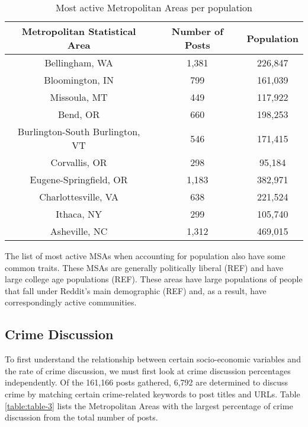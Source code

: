 \documentclass[12pt,oneside, letterpaper]{book}
\begin{document}
\begin{table}[h!]
    \centering
    \small
    \caption{Most active Metropolitan Areas per population}
    \begin{tabular}{| c | c | c |}
    \hline
    Metropolitan Statistical Area & Number of Posts & Population\\ \hline
    Bellingham, WA & 1,381 & 226,847 \\ \hline
    Bloomington, IN & 799 & 161,039 \\ \hline
    Missoula, MT & 449 & 117,922 \\ \hline
    Bend, OR & 660 & 198,253 \\ \hline
    Burlington-South Burlington, VT & 546 & 171,415 \\ \hline
    Corvallis, OR & 298 & 95,184 \\ \hline
    Eugene-Springfield, OR & 1,183 & 382,971 \\ \hline
    Charlottesville, VA & 638 & 221,524 \\ \hline
    Ithaca, NY & 299 & 105,740 \\ \hline
    Asheville, NC & 1,312 & 469,015 \\ \hline
	\end{tabular}
	\label{table:table-2}
\end{table}

\par The list of most active MSAs when accounting for population also have some common traits. These MSAs are generally politically liberal (REF) and have large college age populations (REF). These areas have large populations of people that fall under Reddit's main demographic (REF) and, as a result, have correspondingly active communities.

\subsection{Crime Discussion}

\par To first understand the relationship between certain socio-economic variables and the rate of crime discussion, we must first look at crime discussion percentages independently. Of the 161,166 posts gathered, 6,792 are determined to discuss crime by matching certain crime-related keywords to post titles and URLs. Table \ref{table:table-3} lists the Metropolitan Areas with the largest percentage of crime discussion from the total number of posts.
\end{document}
